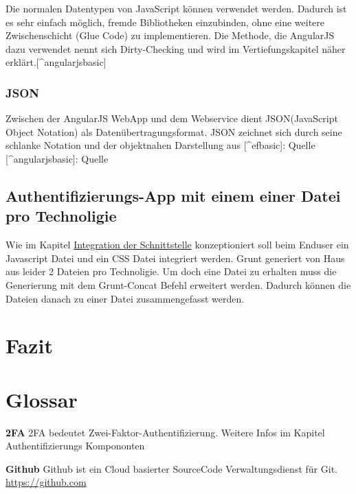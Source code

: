 Die normalen Datentypen von JavaScript können verwendet werden. Dadurch
ist es sehr einfach möglich, fremde Bibliotheken einzubinden, ohne eine
weitere Zwischenschicht (Glue Code) zu implementieren. Die Methode, die
AngularJS dazu verwendet nennt sich Dirty-Checking und wird im
Vertiefungskapitel näher erklärt.{[}\^{}angularjsbasic{]}

\subsection{JSON}\label{json}

Zwischen der AngularJS WebApp und dem Webservice dient JSON(JavaScript
Object Notation) als Datenübertragungsformat. JSON zeichnet sich durch
seine schlanke Notation und der objektnahen Darstellung aus
{[}\^{}efbasic{]}: Quelle \autocite{efbasic} {[}\^{}angularjsbasic{]}:
Quelle \autocite{angularjsbasic}

\section{Authentifizierungs-App mit einem einer Datei pro
Technoligie}\label{authentifizierungs-app-mit-einem-einer-datei-pro-technoligie}

Wie im Kapitel
\protect\hyperlink{integration-der-schnittstelle}{Integration der
Schnittstelle} konzeptioniert soll beim Enduser ein Javascript Datei und
ein CSS Datei integriert werden. Grunt generiert von Haus aus leider 2
Dateien pro Technoligie. Um doch eine Datei zu erhalten muss die
Generierung mit dem Grunt-Concat Befehl erweitert werden. Dadurch können
die Dateien danach zu einer Datei zusammengefasst werden.

\chapter{Fazit}\label{fazit-2}

\newpage

\appendix

\hypertarget{glossar}{\chapter{Glossar}\label{glossar}}

\textbf{2FA} 2FA bedeutet Zwei-Faktor-Authentifizierung. Weitere Infos
im Kapitel Authentifizierungs Kompononten

\textbf{Github} Github ist ein Cloud basierter SourceCode
Verwaltungsdienst für Git. \url{https://github.com}

